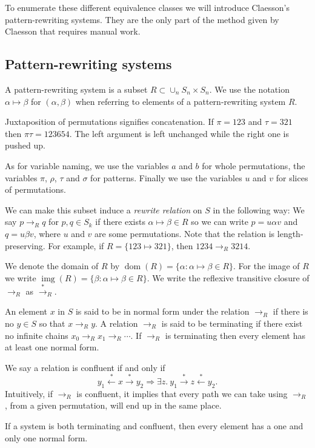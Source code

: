 \documentclass[a4paper, 11pt, english]{article}
\newcommand{\patternrule}{ \mapsto \!}
\theoremstyle{definition}
\newcommand{\Sym}{S}
\newcommand{\from}{\leftarrow}
\newcommand{\tostar}{\stackrel{*}{\to}}
\newcommand{\fromstar}{\stackrel{*}{\from}}
\DeclareMathOperator{\dom}{dom}
\DeclareMathOperator{\img}{img}
\begin{document}
To enumerate these different equivalence classes we will introduce Claesson's 
pattern-rewriting systems. They are the only part of the method given by Claesson that requires
manual work. 

\subsection{Pattern-rewriting systems}
A pattern-rewriting system is a subset $R \subset \cup_{n} \Sym_n \times \Sym_n$.
We use the notation $\alpha \patternrule \beta$ for $(\alpha, \beta)$ when referring
to elements of a pattern-rewriting system $R$. 

Juxtaposition of permutations signifies concatenation. If $\pi=123$ and
$\tau=321$ then $\pi\tau=123654$. The left argument is left unchanged while the
right one is pushed up.

As for variable naming, we use the variables $a$ and $b$ for whole permutations, 
the variables $\pi$, $\rho$, $\tau$ and $\sigma$ for patterns.
Finally we use the variables $u$ and $v$ for slices of permutations.

We can make this subset induce a \emph{rewrite relation} on $\Sym$ in the following way: We say
$p \to_R q$ for $p, q \in \Sym_k$ if there exists $\alpha \patternrule \beta \in R$ so
we can write $p = u \alpha v$ and $q = u \beta v$, where
$u$ and $v$ are some permutations.  Note that the relation is
length-preserving. For example, if $R = \{123 \patternrule 321\}$, then $1234 \to_R 3214$. 

We denote the domain of $R$ by $\dom(R) = \{\alpha : \alpha \patternrule
\beta \in R\}$. For the image of $R$ we write $\img(R) = \{\beta : \alpha
\patternrule \beta \in R\}$. We write the reflexive transitive closure of
$\to_R$ as $\tostar_R$. 

An element $x$ in $\Sym$ is said to be in normal form under the relation $\to_R$
if there is no $y \in \Sym$ so that $x \to_R y$. A relation $\to_R$ is said to be
terminating if there exist no infinite chains $x_0 \to_R x_1 \to_R \cdots$. If
$\to_R$ is terminating then every element has at least one normal form. 

We say a relation is confluent if and only if
$$
    y_1 \fromstar x \tostar y_2 \Longrightarrow 
    \exists z. \  y_1 \tostar z \fromstar y_2.
$$
Intuitively, if $\to_R$ is confluent, it implies that every path we can
take using $\to_R$, from a given permutation, will end up in the same place. 

If a system is both terminating and confluent, then every element has a one and
only one normal form.
\end{document}
